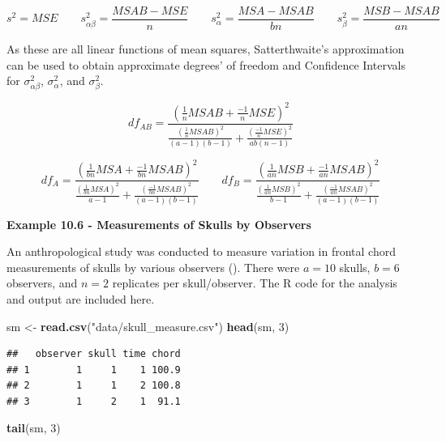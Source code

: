 \documentclass[
]{book}
\newenvironment{Shaded}{\begin{snugshade}}{\end{snugshade}}
\newcommand{\DecValTok}[1]{\textcolor[rgb]{0.00,0.00,0.81}{#1}}
\newcommand{\FunctionTok}[1]{\textcolor[rgb]{0.13,0.29,0.53}{\textbf{#1}}}
\newcommand{\NormalTok}[1]{#1}
\newcommand{\OtherTok}[1]{\textcolor[rgb]{0.56,0.35,0.01}{#1}}
\newcommand{\StringTok}[1]{\textcolor[rgb]{0.31,0.60,0.02}{#1}}
\begin{document}
\[
s^2=MSE \qquad s_{\alpha\beta}^2=\frac{MSAB-MSE}{n}  \qquad
s_{\alpha}^2=\frac{MSA-MSAB}{bn}  \qquad s_{\beta}^2=\frac{MSB-MSAB}{an}
\]

As these are all linear functions of mean squares, Satterthwaite's
approximation can be used to obtain approximate degrees' of freedom and
Confidence Intervals for \(\sigma_{\alpha\beta}^2\),
\(\sigma_{\alpha}^2\), and \(\sigma_{\beta}^2\).

\[
df_{AB}=\frac{\left(\frac{1}{n}MSAB + \frac{-1}{n}MSE\right)^2} {
\frac{\left(\frac{1}{n}MSAB\right)^2}{(a-1)(b-1)} + 
\frac{\left(\frac{-1}{n}MSE\right)^2}{ab(n-1)}
}
\]

\[
df_{A}=\frac{\left(\frac{1}{bn}MSA + \frac{-1}{bn}MSAB\right)^2} {
\frac{\left(\frac{1}{bn}MSA\right)^2}{a-1} + 
\frac{\left(\frac{-1}{bn}MSAB\right)^2}{(a-1)(b-1)}
}
\qquad
df_{B}=\frac{\left(\frac{1}{an}MSB + \frac{-1}{an}MSAB\right)^2} {
\frac{\left(\frac{1}{an}MSB\right)^2}{b-1} + 
\frac{\left(\frac{-1}{an}MSAB\right)^2}{(a-1)(b-1)}
}
\]

\textbf{Example 10.6 - Measurements of Skulls by Observers}

An anthropological study was conducted to measure variation in frontal
chord measurements of skulls by various observers
(). There were
\(a=10\) skulls, \(b=6\) observers, and \(n=2\) replicates per
skull/observer. The R code for the analysis and output are included
here.

\begin{Shaded}
\begin{Highlighting}[]
\NormalTok{sm }\OtherTok{\textless{}{-}} \FunctionTok{read.csv}\NormalTok{(}\StringTok{"data/skull\_measure.csv"}\NormalTok{)}
\FunctionTok{head}\NormalTok{(sm, }\DecValTok{3}\NormalTok{)}
\end{Highlighting}
\end{Shaded}

\begin{verbatim}
##   observer skull time chord
## 1        1     1    1 100.9
## 2        1     1    2 100.8
## 3        1     2    1  91.1
\end{verbatim}

\begin{Shaded}
\begin{Highlighting}[]
\FunctionTok{tail}\NormalTok{(sm, }\DecValTok{3}\NormalTok{)}
\end{Highlighting}
\end{Shaded}
\end{document}
